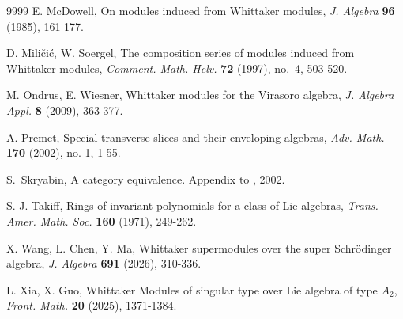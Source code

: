 \documentclass[a4paper,10pt]{article}
\theoremstyle{definition}
\theoremstyle{plain}
\theoremstyle{remark}
\theoremstyle{mystyle}
\numberwithin{equation}{section}
\begin{document}
\begin{thebibliography}{9999}
 E. McDowell, On modules induced from Whittaker modules, {\it J. Algebra} {\bf96} (1985), 161-177.

 D. Mili{\v{c}}i{\'c}, W. Soergel, The composition series of modules induced from Whittaker modules, {\it Comment. Math. Helv.} {\bf 72} (1997), no.~4, 503-520.

 M. Ondrus, E. Wiesner, Whittaker modules for the Virasoro algebra, {\it J. Algebra Appl.} {\bf 8} (2009), 363-377.

 A. Premet, Special transverse slices and their enveloping algebras, {\it Adv. Math.} {\bf 170} (2002), no. 1, 1-55.

 S.~Skryabin, A category equivalence. Appendix to \cite{P02}, 2002.

 S. J. Takiff, Rings of invariant polynomials for a class of Lie algebras, {\it Trans. Amer. Math. Soc.} {\bf 160} (1971), 249-262.

 X. Wang, L. Chen, Y. Ma, Whittaker supermodules over the super Schrödinger algebra, {\it J. Algebra} {\bf691} (2026), 310-336.
    
 L. Xia, X. Guo, Whittaker Modules of singular type over Lie algebra of type $A_2$, {\it Front. Math.} {\bf 20} (2025), 1371-1384.

\end{thebibliography}
\end{document}
